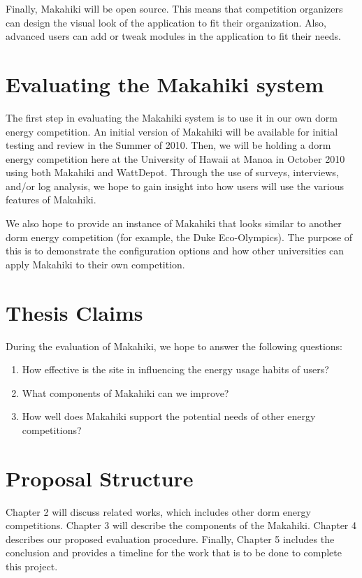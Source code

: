 Finally, Makahiki will be open source.  This means that competition organizers can design the visual look of the application to fit their organization.  Also, advanced users can add or tweak modules in the application to fit their needs.

\section{Evaluating the Makahiki system}

The first step in evaluating the Makahiki system is to use it in our own dorm energy competition.  An initial version of Makahiki will be available for initial testing and review in the Summer of 2010.  Then, we will be holding a dorm energy competition here at the University of Hawaii at Manoa in October 2010 using both Makahiki and WattDepot.  Through the use of surveys, interviews, and/or log analysis, we hope to gain insight into how users will use the various features of Makahiki.

We also hope to provide an instance of Makahiki that looks similar to another dorm energy competition (for example, the Duke Eco-Olympics).  The purpose of this is to demonstrate the configuration options and how other universities can apply Makahiki to their own competition.

\section{Thesis Claims}

During the evaluation of Makahiki, we hope to answer the following questions:

\begin{enumerate}
	\item How effective is the site in influencing the energy usage habits of users?
	\item What components of Makahiki can we improve?
	\item How well does Makahiki support the potential needs of other energy competitions?
\end{enumerate}

\section{Proposal Structure}

Chapter 2 will discuss related works, which includes other dorm energy competitions.  Chapter 3 will describe the components of the Makahiki.  Chapter 4 describes our proposed evaluation procedure.  Finally, Chapter 5 includes the conclusion and provides a timeline for the work that is to be done to complete this project.

